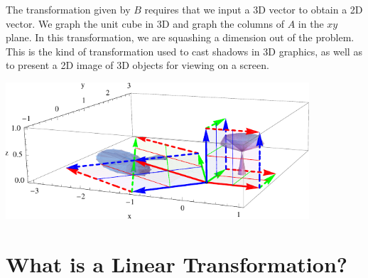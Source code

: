 \begin{example}
The transformation given by $B$ requires that we input a 3D vector to obtain a 2D vector.  We graph the unit cube in 3D and graph the columns of $A$ in the $xy$ plane. In this transformation, we are squashing a dimension out of the problem. This is the kind of transformation used to cast shadows in 3D graphics, as well as to present a 2D image of 3D objects for viewing on a screen. 
\begin{center}
\includegraphics[height=2in]{04-Linear-Transformations/support/LT3dto2d}
\end{center}


\end{example}






\section{What is a Linear Transformation?}

